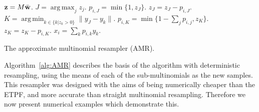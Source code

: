 \documentclass[final]{siamltex}
\renewcommand{\b}[1]{{\bf #1}}
\DeclareMathOperator*{\argmin}{arg\,min}
\DeclareMathOperator*{\argmax}{arg\,max}
\begin{document}
\begin{table}[!ht]
\centering
\begin{algorithm}[H]
\DontPrintSemicolon
\BlankLine
	$\b{z} = M\bar{\b{w}}$.\;
	{
		$J = \argmax_j z_j$.\;
		$p_{i,J} = \min\{1,z_J\}$.\;
		$z_J = z_J - p_{i,J}$.\;
		{
			$K = \argmin_{k \in \{k|z_k>0\}} \|y_J - y_k\|$.\;
			$p_{i,K} = \min\{1-\sum_j p_{i,j}, z_K\}$.\;
			$z_K = z_K - p_{i,K}$.\;
		}
		$x_i = \sum_k p_{i,k}y_k$.\;
	}
\caption{The approximate multinomial resampler (AMR).\label{alg:AMR}}
\end{algorithm}
\end{table}

Algorithm~\ref{alg:AMR} describes the basis of the algorithm with
deterministic resampling, using the means of each of the
sub-multinomials as the new samples. This resampler was designed with the aims of being
numerically cheaper than the ETPF, and more accurate than straight multinomial
resampling. Therefore we now present numerical examples which
demonstrate this.
\end{document}
